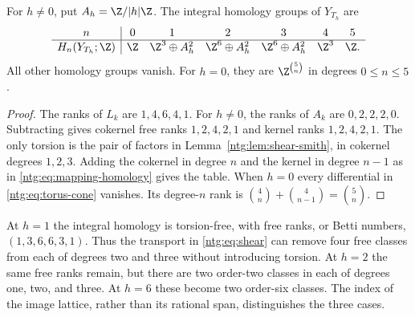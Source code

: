 \begin{theorem}\label{ntg:thm:shear-homology}
For $h\ne0$, put $A_h=\Z/|h|\Z$. The integral homology groups
of $Y_{T_h}$ are
\begin{equation}\label{ntg:eq:shear-homology}
\begin{array}{c|cccccc}
 n&0&1&2&3&4&5\\ \hline
 H_n(Y_{T_h};\Z)&\Z&\Z^3\oplus A_h^2&\Z^6\oplus A_h^2&
 \Z^6\oplus A_h^2&\Z^3&\Z.
\end{array}
\end{equation}
All other homology groups vanish. For $h=0$, they are
$\Z^{\binom5n}$ in degrees $0\le n\le5$.
\end{theorem}
\begin{proof}
The ranks of $L_k$ are $1,4,6,4,1$. For $h\ne0$, the ranks of
$A_k$ are $0,2,2,2,0$. Subtracting gives cokernel free ranks
$1,2,4,2,1$ and kernel ranks $1,2,4,2,1$.
The only torsion is the pair of factors in
Lemma~\ref{ntg:lem:shear-smith}, in cokernel degrees $1,2,3$.
Adding the cokernel in degree $n$ and the kernel in degree $n-1$
as in \eqref{ntg:eq:mapping-homology} gives the table. When $h=0$ every
differential in \eqref{ntg:eq:torus-cone} vanishes. Its degree-$n$ rank
is $\binom4n+\binom4{n-1}=\binom5n$.
\end{proof}

At $h=1$ the integral homology is torsion-free, with free ranks, or
Betti numbers, $(1,3,6,6,3,1)$. Thus the transport in
\eqref{ntg:eq:shear} can remove four
free classes from each of degrees two and three without introducing
torsion. At $h=2$ the same free ranks remain, but there are two
order-two classes in each of degrees one, two, and three. At $h=6$
these become two order-six classes. The index of the image lattice,
rather than its rational span, distinguishes the three cases.

